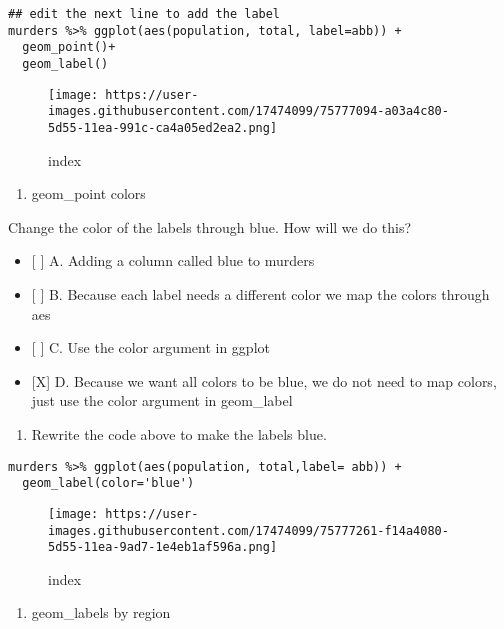 \documentclass[]{article}
\providecommand{\tightlist}{%
  \setlength{\itemsep}{0pt}\setlength{\parskip}{0pt}}
\begin{document}
\begin{verbatim}
## edit the next line to add the label
murders %>% ggplot(aes(population, total, label=abb)) +
  geom_point()+
  geom_label()
\end{verbatim}

\begin{figure}
\centering
\texttt{[image: https://user-images.githubusercontent.com/17474099/75777094-a03a4c80-5d55-11ea-991c-ca4a05ed2ea2.png]}
\caption{index}
\end{figure}

\begin{enumerate}
\def\labelenumi{\arabic{enumi}.}
\setcounter{enumi}{8}
\tightlist
\item
  geom\_point colors
\end{enumerate}

Change the color of the labels through blue. How will we do this?

\begin{itemize}
\tightlist
\item
  {[} {]} A. Adding a column called blue to murders
\item
  {[} {]} B. Because each label needs a different color we map the
  colors through aes
\item
  {[} {]} C. Use the color argument in ggplot
\item
  {[}X{]} D. Because we want all colors to be blue, we do not need to
  map colors, just use the color argument in geom\_label
\end{itemize}

\begin{enumerate}
\def\labelenumi{\arabic{enumi}.}
\setcounter{enumi}{9}
\tightlist
\item
  Rewrite the code above to make the labels blue.
\end{enumerate}

\begin{verbatim}
murders %>% ggplot(aes(population, total,label= abb)) +
  geom_label(color='blue')
\end{verbatim}

\begin{figure}
\centering
\texttt{[image: https://user-images.githubusercontent.com/17474099/75777261-f14a4080-5d55-11ea-9ad7-1e4eb1af596a.png]}
\caption{index}
\end{figure}

\begin{enumerate}
\def\labelenumi{\arabic{enumi}.}
\setcounter{enumi}{10}
\tightlist
\item
  geom\_labels by region
\end{enumerate}
\end{document}
